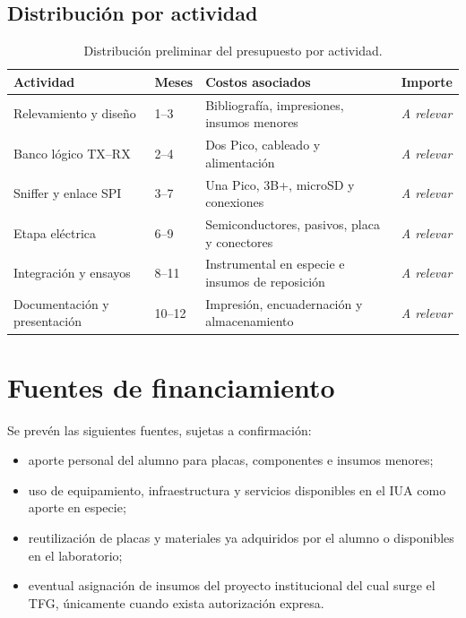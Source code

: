 \documentclass[12pt,a4paper,oneside]{article}
\newcommand{\MontoARelevar}{\textit{A relevar}}
\begin{document}
\subsection{Distribución por actividad}

\begin{table}[H]
  \centering
  \small
  \begin{tabularx}{\textwidth}{X p{3.0cm} p{3.3cm} p{2.6cm}}
    \toprule
    \textbf{Actividad} & \textbf{Meses} & \textbf{Costos asociados} & \textbf{Importe} \\
    \midrule
    Relevamiento y diseño & 1--3 & Bibliografía, impresiones, insumos menores & \MontoARelevar \\
    Banco lógico TX--RX & 2--4 & Dos Pico, cableado y alimentación & \MontoARelevar \\
    Sniffer y enlace SPI & 3--7 & Una Pico, 3B+, microSD y conexiones & \MontoARelevar \\
    Etapa eléctrica & 6--9 & Semiconductores, pasivos, placa y conectores & \MontoARelevar \\
    Integración y ensayos & 8--11 & Instrumental en especie e insumos de reposición & \MontoARelevar \\
    Documentación y presentación & 10--12 & Impresión, encuadernación y almacenamiento & \MontoARelevar \\
    \bottomrule
  \end{tabularx}
  \caption{Distribución preliminar del presupuesto por actividad.}
  \label{tab:presupuesto-actividad}
\end{table}

\section{Fuentes de financiamiento}

Se prevén las siguientes fuentes, sujetas a confirmación:

\begin{itemize}
  \item aporte personal del alumno para placas, componentes e insumos menores;
  \item uso de equipamiento, infraestructura y servicios disponibles en el IUA como aporte en especie;
  \item reutilización de placas y materiales ya adquiridos por el alumno o disponibles en el laboratorio;
  \item eventual asignación de insumos del proyecto institucional del cual surge el TFG, únicamente cuando exista autorización expresa.
\end{itemize}
\end{document}
